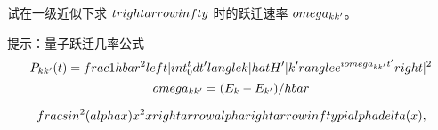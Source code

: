 试在一级近似下求 $t \\rightarrow \\infty$ 时的跃迁速率 $\\omega_{kk'}$。

提示：量子跃迁几率公式
$$P_{kk'}(t) = \\frac{1}{\\hbar^2} \\left| \\int_0^t dt' \\langle k|\\hat{H}'|k'\\rangle e^{i\\omega_{kk'}t'} \\right|^2$$
$$\\omega_{kk'} = (E_k - E_{k'})/\\hbar$$

$$\\frac{\\sin^2(\\alpha x)}{x^2} \\xrightarrow{\\alpha \\rightarrow \\infty} \\pi \\alpha \\delta(x),$$